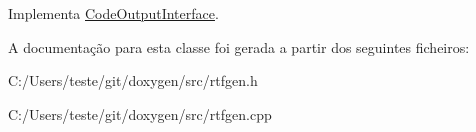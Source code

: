Implementa \hyperlink{class_code_output_interface_a4ab86013abbf61a86e9c300eb805939a}{Code\-Output\-Interface}.



A documentação para esta classe foi gerada a partir dos seguintes ficheiros\-:\begin{DoxyCompactItemize}
\item 
C\-:/\-Users/teste/git/doxygen/src/rtfgen.\-h\item 
C\-:/\-Users/teste/git/doxygen/src/rtfgen.\-cpp\end{DoxyCompactItemize}
